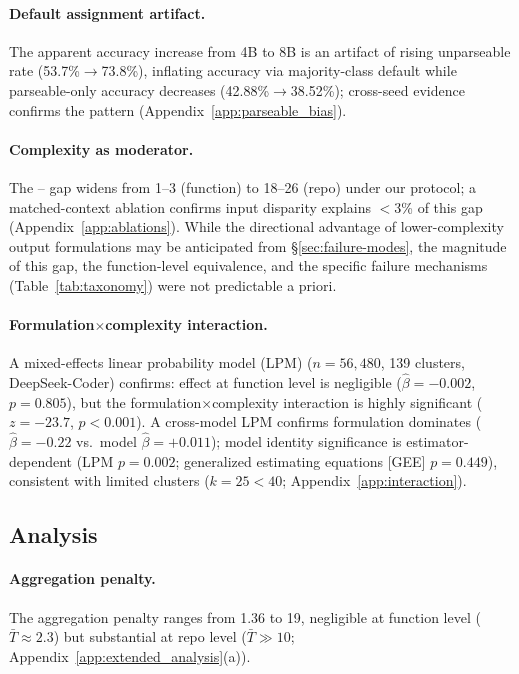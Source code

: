 \paragraph{Default assignment artifact.} The apparent \cwm{} accuracy increase from 4B to 8B is an artifact of rising unparseable rate (53.7\%$\to$73.8\%), inflating accuracy via majority-class default while parseable-only accuracy decreases (42.88\%$\to$38.52\%); cross-seed evidence confirms the pattern (Appendix~\ref{app:parseable_bias}).

\paragraph{Complexity as moderator.} The \cls{}--\cwm{} gap widens from 1--3\pp{} (function) to 18--26\pp{} (repo) under our protocol; a matched-context ablation confirms input disparity explains $<$3\% of this gap (Appendix~\ref{app:ablations}). While the directional advantage of lower-complexity output formulations may be anticipated from \S\ref{sec:failure-modes}, the magnitude of this gap, the function-level equivalence, and the specific failure mechanisms (Table~\ref{tab:taxonomy}) were not predictable a priori.

\paragraph{Formulation$\times$complexity interaction.} A mixed-effects linear probability model (LPM) ($n{=}56{,}480$, 139 clusters, DeepSeek-Coder) confirms: \cwm{} effect at function level is negligible ($\hat{\beta}{=}-0.002$, $p{=}0.805$), but the formulation$\times$complexity interaction is highly significant ($z{=}-23.7$, $p{<}0.001$). A cross-model LPM confirms formulation dominates ($\hat{\beta}{=}-0.22$ vs.\ model $\hat{\beta}{=}+0.011$); model identity significance is estimator-dependent (LPM $p{=}0.002$; generalized estimating equations [GEE] $p{=}0.449$), consistent with limited clusters ($k{=}25 < 40$; Appendix~\ref{app:interaction}).

\subsection{Analysis}
\label{sec:analysis}

\paragraph{Aggregation penalty.} The aggregation penalty ranges from 1.36\pp{} to 19\pp{}, negligible at function level ($\bar{T} \approx 2.3$) but substantial at repo level ($\bar{T} \gg 10$; Appendix~\ref{app:extended_analysis}(a)).

